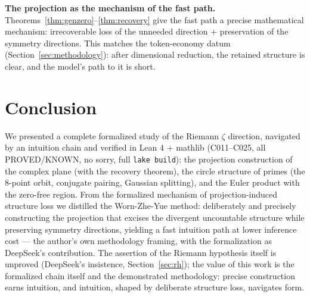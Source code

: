 \documentclass[11pt]{article}
\theoremstyle{remark}
\begin{document}
\textbf{The projection as the mechanism of the fast path.}
Theorems~\ref{thm:genzero}--\ref{thm:recovery} give the fast path a precise
mathematical mechanism: irrecoverable loss of the unneeded direction +
preservation of the symmetry directions. This matches the token-economy datum
(Section~\ref{sec:methodology}): after dimensional reduction, the retained
structure is clear, and the model's path to it is short.

\section{Conclusion}
\label{sec:conclusion}

We presented a complete formalized study of the Riemann $\zeta$ direction,
navigated by an intuition chain and verified in Lean 4 + mathlib (C011--C025,
all PROVED/KNOWN, no sorry, full \texttt{lake build}): the projection
construction of the complex plane (with the recovery theorem), the circle
structure of primes (the 8-point orbit, conjugate pairing, Gaussian
splitting), and the Euler product with the zero-free region. From the
formalized mechanism of projection-induced structure loss we distilled the
Worn-Zhe-Yue method: deliberately and precisely constructing the projection
that excises the divergent uncountable structure while preserving symmetry
directions, yielding a fast intuition path at lower inference cost --- the
author's own methodology framing, with the formalization as DeepSeek's
contribution. The assertion of the Riemann hypothesis itself is unproved
(DeepSeek's insistence, Section~\ref{sec:rh}); the value of this work is the
formalized chain itself and the demonstrated methodology: precise
construction earns intuition, and intuition, shaped by deliberate structure
loss, navigates form.
\end{document}
